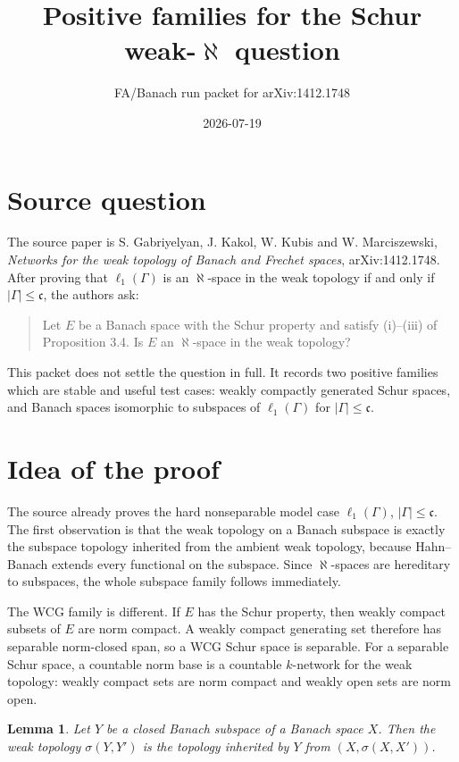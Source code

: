 \documentclass[11pt]{article}
\title{Positive families for the Schur weak-\(\aleph\) question}
\author{FA/Banach run packet for arXiv:1412.1748}
\date{2026-07-19}
\newtheorem{lemma}{Lemma}
\begin{document}
\maketitle

\section*{Source question}

The source paper is S. Gabriyelyan, J. Kakol, W. Kubis and W. Marciszewski,
\emph{Networks for the weak topology of Banach and Frechet spaces},
arXiv:1412.1748.
After proving that \(\ell_1(\Gamma)\) is an \(\aleph\)-space in the weak
topology if and only if \(|\Gamma|\leq\mathfrak c\), the authors ask:

\begin{quote}
Let \(E\) be a Banach space with the Schur property and satisfy (i)--(iii)
of Proposition 3.4. Is \(E\) an \(\aleph\)-space in the weak topology?
\end{quote}

This packet does not settle the question in full.  It records two positive
families which are stable and useful test cases: weakly compactly generated
Schur spaces, and Banach spaces isomorphic to subspaces of \(\ell_1(\Gamma)\)
for \(|\Gamma|\leq\mathfrak c\).

\section*{Idea of the proof}

The source already proves the hard nonseparable model case
\(\ell_1(\Gamma)\), \(|\Gamma|\leq\mathfrak c\).  The first observation is
that the weak topology on a Banach subspace is exactly the subspace topology
inherited from the ambient weak topology, because Hahn--Banach extends every
functional on the subspace.  Since \(\aleph\)-spaces are hereditary to
subspaces, the whole subspace family follows immediately.

The WCG family is different.  If \(E\) has the Schur property, then weakly
compact subsets of \(E\) are norm compact.  A weakly compact generating set
therefore has separable norm-closed span, so a WCG Schur space is separable.
For a separable Schur space, a countable norm base is a countable \(k\)-network
for the weak topology: weakly compact sets are norm compact and weakly open
sets are norm open.

\begin{lemma}\label{lem:subspace}
Let \(Y\) be a closed Banach subspace of a Banach space \(X\).  Then the weak
topology \(\sigma(Y,Y')\) is the topology inherited by \(Y\) from
\((X,\sigma(X,X'))\).
\end{lemma}
\end{document}
